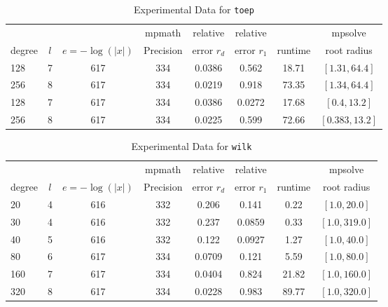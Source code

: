 \documentclass[sigconf]{acmart}
\begin{document}
\begin{table}[t]
\caption{Experimental Data for \texttt{toep}} %
\label{tab:toep}
\vskip -0.15in
\begin{center}
\begin{small}
\begin{sc}
\begin{tabular}{lccccccc}
\toprule
&  &  & mpmath & relative  & relative &  & mpsolve \\
degree  & $l$& $e=-\log(|x|)$& Precision &error $r_d$       & error $r_1$ &runtime& root radius\\
\midrule
 128 & 7 & 617 & 334 & 0.0386 & 0.562 & 18.71 & $[1.31, 64.4]$\\
 256 & 8 & 617 & 334 & 0.0219 & 0.918 & 73.35 & $[1.34, 64.4]$\\
 128 & 7 & 617 & 334 & 0.0386 & 0.0272 & 17.68 & $[0.4, 13.2]$\\
 256 & 8 & 617 & 334 & 0.0225 & 0.599 & 72.66 & $[0.383, 13.2]$\\
\bottomrule
\end{tabular}
\end{sc}
\end{small}
\end{center}
\vskip 0.05in
\end{table}


\begin{table}[t]
\caption{Experimental Data for \texttt{wilk}} %
\label{tab:wilk}
\vskip -0.15in
\begin{center}
\begin{small}
\begin{sc}
\begin{tabular}{lccccccc}
\toprule
&  &  & mpmath & relative  & relative &  & mpsolve \\
degree  & $l$& $e=-\log(|x|)$& Precision &error $r_d$       & error $r_1$ &runtime& root radius\\
\midrule
 20 & 4 & 616 & 332 & 0.206 & 0.141 & 0.22 & $[1.0, 20.0]$\\
 30 & 4 & 616 & 332 & 0.237 & 0.0859 & 0.33 & $[1.0, 319.0]$\\
 40 & 5 & 616 & 332 & 0.122 & 0.0927 & 1.27 & $[1.0, 40.0]$\\
 80 & 6 & 617 & 334 & 0.0709 & 0.121 & 5.59 & $[1.0, 80.0]$\\
 160 & 7 & 617 & 334 & 0.0404 & 0.824 & 21.82 & $[1.0, 160.0]$\\
 320 & 8 & 617 & 334 & 0.0228 & 0.983 & 89.77 & $[1.0, 320.0]$\\
\bottomrule
\end{tabular}
\end{sc}
\end{small}
\end{center}
\vskip 0.05in
\end{table}
\end{document}
